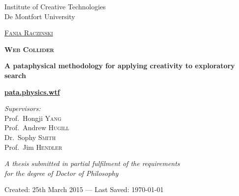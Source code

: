 
\begin{titlingpage}
\begin{center}

Institute of Creative Technologies\\
De Montfort University

\vspace{2cm}

\textsc{\huge \href{http://fania.uk}{Fania Raczinski}}

\vspace{2cm}


\textsc{\Huge \bfseries Web Collider}

\vspace{1.5cm}

{\huge \bfseries A pataphysical methodology for applying creativity to exploratory search}

\vspace{1cm}
{\Huge \textbf{\url{pata.physics.wtf}}}
\vspace{2cm}

\emph{Supervisors:}\\
{Prof.\ Hongji \textsc{Yang}}\\
{Prof.\ Andrew \textsc{Hugill}}\\
{Dr.\ Sophy \textsc{Smith}}\\
{Prof.\ Jim \textsc{Hendler}}

\vspace{1.5cm}

\large \textit{A thesis submitted in partial fulfilment of the requirements\\ for the degree of Doctor of Philosophy}

\vfill

Created: {25th March 2015} --- Last Saved: {\today}\\

\end{center}
\end{titlingpage}
